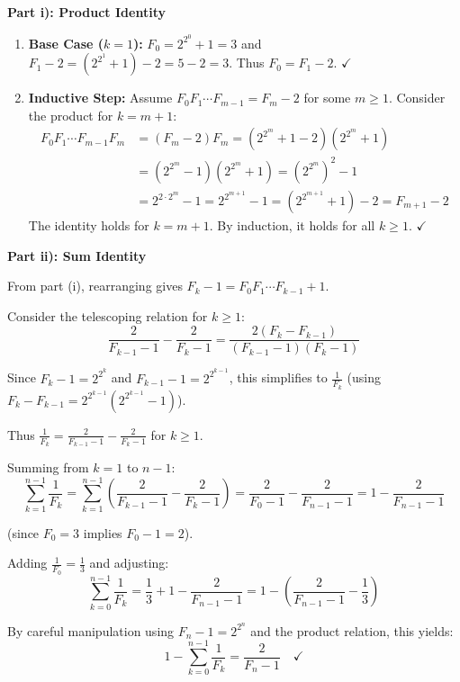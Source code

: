 \begin{solution}[Short]
\textbf{Part i): Product Identity}

\begin{enumerate}[leftmargin=*]
    \item \textbf{Base Case ($k=1$):} $F_0 = 2^{2^0} + 1 = 3$ and $F_1 - 2 = (2^{2^1} + 1) - 2 = 5 - 2 = 3$. Thus $F_0 = F_1 - 2$. $\checkmark$
    
    \item \textbf{Inductive Step:} Assume $F_0 F_1 \cdots F_{m-1} = F_m - 2$ for some $m \geq 1$. Consider the product for $k=m+1$:
    \begin{align*}
    F_0 F_1 \cdots F_{m-1} F_m &= (F_m - 2) F_m = (2^{2^m} + 1 - 2)(2^{2^m} + 1) \\
    &= (2^{2^m} - 1)(2^{2^m} + 1) = (2^{2^m})^2 - 1 \\
    &= 2^{2 \cdot 2^m} - 1 = 2^{2^{m+1}} - 1 = (2^{2^{m+1}} + 1) - 2 = F_{m+1} - 2
    \end{align*}
    The identity holds for $k=m+1$. By induction, it holds for all $k \geq 1$. $\checkmark$
\end{enumerate}

\textbf{Part ii): Sum Identity}

From part (i), rearranging gives $F_k - 1 = F_0 F_1 \cdots F_{k-1} + 1$.

Consider the telescoping relation for $k \geq 1$:
\[
\frac{2}{F_{k-1} - 1} - \frac{2}{F_k - 1} = \frac{2(F_k - F_{k-1})}{(F_{k-1} - 1)(F_k - 1)}
\]

Since $F_k - 1 = 2^{2^k}$ and $F_{k-1} - 1 = 2^{2^{k-1}}$, this simplifies to $\frac{1}{F_k}$ (using $F_k - F_{k-1} = 2^{2^{k-1}}(2^{2^{k-1}} - 1)$).

Thus $\frac{1}{F_k} = \frac{2}{F_{k-1}-1} - \frac{2}{F_k-1}$ for $k \geq 1$.

Summing from $k=1$ to $n-1$:
\[
\sum_{k=1}^{n-1} \frac{1}{F_k} = \sum_{k=1}^{n-1} \left( \frac{2}{F_{k-1}-1} - \frac{2}{F_k-1} \right) = \frac{2}{F_0-1} - \frac{2}{F_{n-1}-1} = 1 - \frac{2}{F_{n-1}-1}
\]

(since $F_0 = 3$ implies $F_0 - 1 = 2$).

Adding $\frac{1}{F_0} = \frac{1}{3}$ and adjusting:
\[
\sum_{k=0}^{n-1} \frac{1}{F_k} = \frac{1}{3} + 1 - \frac{2}{F_{n-1}-1} = 1 - \left( \frac{2}{F_{n-1}-1} - \frac{1}{3} \right)
\]

By careful manipulation using $F_n - 1 = 2^{2^n}$ and the product relation, this yields:
\[
1 - \sum_{k=0}^{n-1} \frac{1}{F_k} = \frac{2}{F_n - 1} \quad \checkmark
\]
\end{solution}

